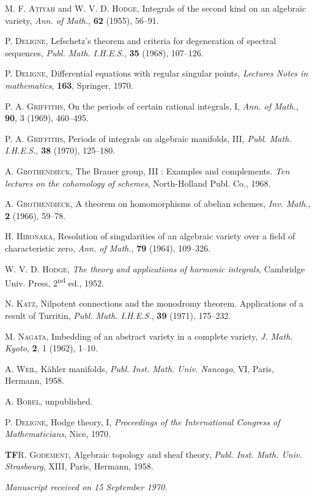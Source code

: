 \documentclass[10pt]{article}
\begin{document}
\begin{enumerate}[label={[\arabic*]},leftmargin=2.8em]
\item \textsc{M. F. Atiyah} and \textsc{W. V. D. Hodge}, Integrals of the second kind on an algebraic variety, \emph{Ann. of Math.}, \textbf{62} (1955), 56--91.
\item \textsc{P. Deligne}, Lefschetz's theorem and criteria for degeneration of spectral sequences, \emph{Publ. Math. I.H.E.S.}, \textbf{35} (1968), 107--126.
\item \textsc{P. Deligne}, Differential equations with regular singular points, \emph{Lectures Notes in mathematics}, \textbf{163}, Springer, 1970.
\item \textsc{P. A. Griffiths}, On the periods of certain rational integrals, I, \emph{Ann. of Math.}, \textbf{90}, 3 (1969), 460--495.
\item \textsc{P. A. Griffiths}, Periods of integrals on algebraic manifolds, III, \emph{Publ. Math. I.H.E.S.}, \textbf{38} (1970), 125--180.
\item \textsc{A. Grothendieck}, The Brauer group, III : Examples and complements. \emph{Ten lectures on the cohomology of schemes}, North-Holland Publ. Co., 1968.
\item \textsc{A. Grothendieck}, A theorem on homomorphisms of abelian schemes, \emph{Inv. Math.}, \textbf{2} (1966), 59--78.
\item \textsc{H. Hironaka}, Resolution of singularities of an algebraic variety over a field of characteristic zero, \emph{Ann. of Math.}, \textbf{79} (1964), 109--326.
\item \textsc{W. V. D. Hodge}, \emph{The theory and applications of harmonic integrals}, Cambridge Univ. Press, 2\textsuperscript{nd} ed., 1952.
\item \textsc{N. Katz}, Nilpotent connections and the monodromy theorem. Applications of a result of Turritin, \emph{Publ. Math. I.H.E.S.}, \textbf{39} (1971), 175--232.
\item \textsc{M. Nagata}, Imbedding of an abstract variety in a complete variety, \emph{J. Math. Kyoto}, \textbf{2}, 1 (1962), 1--10.
\item \textsc{A. Weil}, Kähler manifolds, \emph{Publ. Inst. Math. Univ. Nancago}, VI, Paris, Hermann, 1958.
\item \textsc{A. Borel}, unpublished.
\item \textsc{P. Deligne}, Hodge theory, I, \emph{Proceedings of the International Congress of Mathematicians}, Nice, 1970.
\end{enumerate}

\noindent\textbf{TF}\quad \textsc{R. Godement}, Algebraic topology and sheaf theory, \emph{Publ. Inst. Math. Univ. Strasbourg}, XIII, Paris, Hermann, 1958.

\begin{center}
\emph{Manuscript received on 15 September 1970.}
\end{center}

\end{document}
